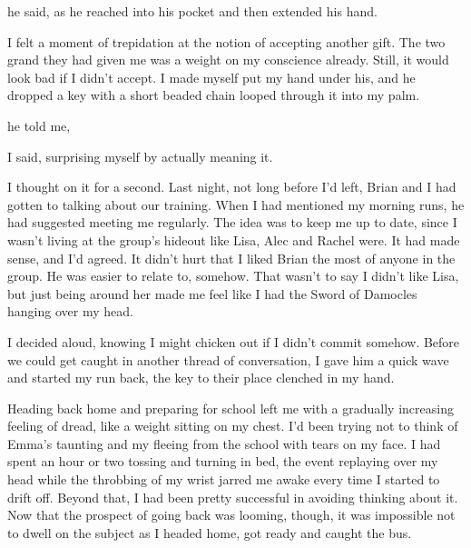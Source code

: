  he said, as he reached into his pocket and then extended his hand.

I felt a moment of trepidation at the notion of accepting another gift. The two grand they had given me was a weight on my conscience already. Still, it would look bad if I didn't accept. I made myself put my hand under his, and he dropped a key with a short beaded chain looped through it into my palm.

 he told me, 

 I said, surprising myself by actually meaning it.


I thought on it for a second. Last night, not long before I'd left, Brian and I had gotten to talking about our training. When I had mentioned my morning runs, he had suggested meeting me regularly. The idea was to keep me up to date, since I wasn't living at the group's hideout like Lisa, Alec and Rachel were. It had made sense, and I'd agreed. It didn't hurt that I liked Brian the most of anyone in the group. He was easier to relate to, somehow. That wasn't to say I didn't like Lisa, but just being around her made me feel like I had the Sword of Damocles hanging over my head.

 I decided aloud, knowing I might chicken out if I didn't commit somehow. Before we could get caught in another thread of conversation, I gave him a quick wave and started my run back, the key to their place clenched in my hand.

Heading back home and preparing for school left me with a gradually increasing feeling of dread, like a weight sitting on my chest. I'd been trying not to think of Emma's taunting and my fleeing from the school with tears on my face. I had spent an hour or two tossing and turning in bed, the event replaying over my head while the throbbing of my wrist jarred me awake every time I started to drift off. Beyond that, I had been pretty successful in avoiding thinking about it. Now that the prospect of going back was looming, though, it was impossible not to dwell on the subject as I headed home, got ready and caught the bus.

